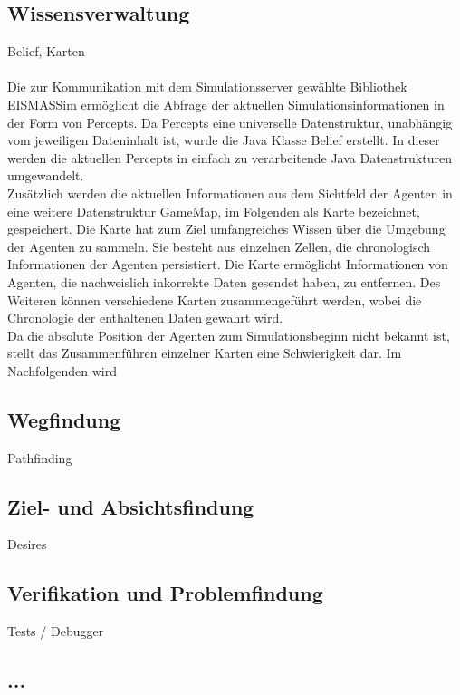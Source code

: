\documentclass[runningheads]{llncs}
\begin{document}
\subsection{Wissensverwaltung}\label{wissensverwaltung}
Belief, Karten
\\
\\
Die zur Kommunikation mit dem Simulationsserver gewählte Bibliothek EISMASSim \cite{EISMASSim} ermöglicht die Abfrage der aktuellen Simulationsinformationen in der Form von Percepts. Da Percepts eine universelle Datenstruktur, unabhängig vom jeweiligen Dateninhalt ist, wurde die Java Klasse Belief erstellt. In dieser werden die aktuellen Percepts in einfach zu verarbeitende Java Datenstrukturen umgewandelt. \\
Zusätzlich werden die aktuellen Informationen aus dem Sichtfeld der Agenten in eine weitere Datenstruktur GameMap, im Folgenden als Karte bezeichnet, gespeichert. Die Karte hat zum Ziel umfangreiches Wissen über die Umgebung der Agenten zu sammeln. Sie besteht aus einzelnen Zellen, die chronologisch Informationen der Agenten persistiert. Die Karte ermöglicht Informationen von Agenten, die nachweislich inkorrekte Daten gesendet haben, zu entfernen. Des Weiteren können verschiedene Karten zusammengeführt werden, wobei die Chronologie der enthaltenen Daten gewahrt wird. \\
Da die absolute Position der Agenten zum Simulationsbeginn nicht bekannt ist, stellt das Zusammenführen einzelner Karten eine Schwierigkeit dar. Im Nachfolgenden wird 

\subsection{Wegfindung}\label{wegfindung}
Pathfinding

\subsection{Ziel- und Absichtsfindung}\label{absichtsfindung}
Desires

\subsection{Verifikation und Problemfindung}\label{verifikation}
Tests / Debugger

\subsection{...}
\end{document}
